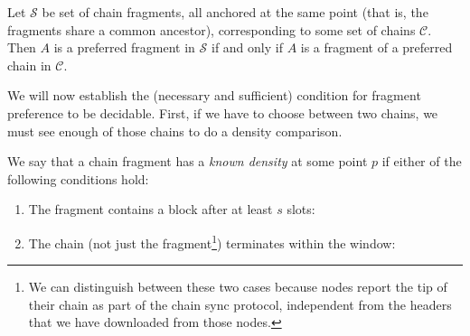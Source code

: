 \begin{definition}
Let $\mathcal{S}$ be set of chain fragments, all anchored at the same point
(that is, the fragments share a common ancestor), corresponding to some set of
chains $\mathcal{C}$. Then $A$ is a preferred fragment in $\mathcal{S}$ if and
only if $A$ is a fragment of a preferred chain in $\mathcal{C}$.
\end{definition}

We will now establish the (necessary and sufficient) condition for fragment
preference to be decidable. First, if we have to choose between two chains, we
must see enough of those chains to do a density comparison.

\begin{definition}
We say that a chain fragment has a \emph{known density} at some point $p$
if either of the following conditions hold:

\begin{enumerate}
\item The fragment contains a block after at least $s$ slots:
\begin{center}
\end{center}

\item The chain (not just the fragment\footnote{We can distinguish between these
two cases because nodes report the tip of their chain as part of the chain sync
protocol, independent from the headers that we have downloaded from those
nodes.}) terminates within the window:
\begin{center}
\end{center}
\end{enumerate}
\end{definition}

